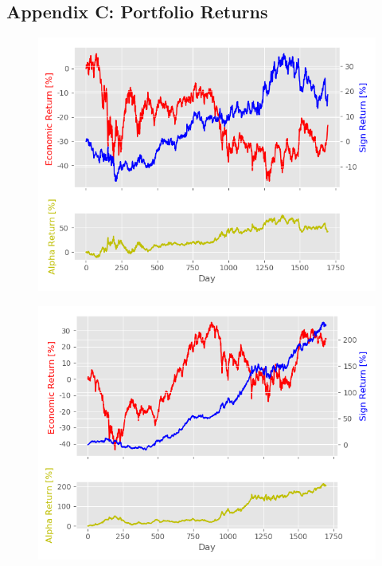 \begin{appendices}
\chapter*{Appendix C: Portfolio Returns} \label{appendix3}
\newpage

\begin{figure}
\centering
\begin{minipage}{.5\textwidth}
  \centering
  \includegraphics[scale=0.5]{Plot/BucketNumber1ReturnPlot.png}
  \label{fig:test1}
\end{minipage}%
\begin{minipage}{.5\textwidth}
  \centering
  \includegraphics[scale=0.5]{Plot/BucketNumber2ReturnPlot.png}
  \label{fig:test2}
\end{minipage}
\end{figure}



\end{appendices}
